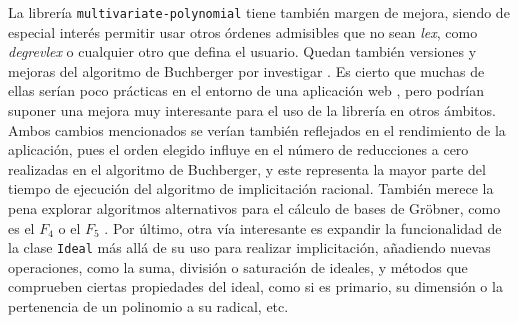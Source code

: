 La librería \texttt{multivariate-polynomial} tiene también margen de mejora, siendo de especial interés permitir usar otros órdenes admisibles que no sean \textit{lex}, como \textit{degrevlex} o cualquier otro que defina el usuario. Quedan también versiones y mejoras del algoritmo de Buchberger por investigar \cite{conc1,conc2,conc3,conc4}. Es cierto que muchas de ellas serían poco prácticas en el entorno de una aplicación web \cite{conc5}, pero podrían suponer una mejora muy interesante para el uso de la librería en otros ámbitos. Ambos cambios mencionados se verían también reflejados en el rendimiento de la aplicación, pues el orden elegido influye en el número de reducciones a cero realizadas en el algoritmo de Buchberger, y este representa la mayor parte del tiempo de ejecución del algoritmo de implicitación racional. También merece la pena explorar algoritmos alternativos para el cálculo de bases de Gröbner, como es el $F_4$ o el $F_5$ \cite{conc6, conc7}. Por último, otra vía interesante es expandir la funcionalidad de la clase \texttt{Ideal} más allá de su uso para realizar implicitación, añadiendo nuevas operaciones, como la suma, división o saturación de ideales, y métodos que comprueben ciertas propiedades del ideal, como si es primario, su dimensión o la pertenencia de un polinomio a su radical, etc.